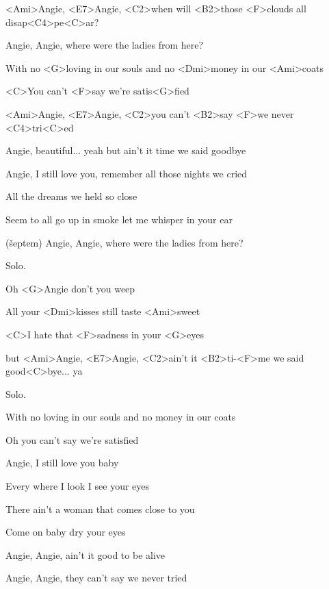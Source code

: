 

\zs
<Ami>Angie, <E7>Angie, <C2>when will <B2>those <F>clouds all disap<C4>pe<C>ar?

Angie, Angie, where were the ladies from here?
\ks

\zr
With no <G>loving in our souls and no <Dmi>money in our <Ami>coats

<C>You can't <F>say we're satis<G>fied

<Ami>Angie, <E7>Angie, <C2>you can't <B2>say <F>we never <C4>tri<C>ed
\kr

\zs
Angie, beautiful... yeah but ain't it time we said goodbye

Angie, I still love you, remember all those nights we cried
\ks

\zr
All the dreams we held so close

Seem to all go up in smoke let me whisper in your ear

(šeptem) Angie, Angie, where were the ladies from here?
\kr

Solo.

\zr
Oh <G>Angie don't you weep

All your <Dmi>kisses still taste <Ami>sweet

<C>I hate that <F>sadness in your <G>eyes

but <Ami>Angie, <E7>Angie, <C2>ain't it <B2>ti-<F>me we said good<C>bye... ya
\kr

Solo.

\zr
With no {loving} in our souls
and no {money} in our {coats}

{Oh} you can't {say} we're satisfied
\kr

\zs
Angie, I still love you baby

Every where I look I see your eyes
\ks

\zs
{There} ain't a woman that comes {close} to you

{Come} on {baby} dry your {eyes}

Angie, {Angie,} {ain't} it {good} to be alive

Angie, Angie, they can't say we never tried
\ks

\kp





